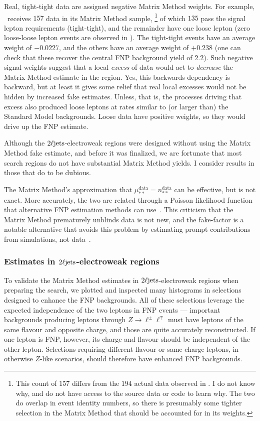 Real, tight-tight data are assigned negative Matrix Method weights.
For example, \crvz\ receives $157$ data in its Matrix Method sample,%
\footnote{%
This count of $157$ differs from the $194$ actual data observed in \crvz.
I do not know why, and do not have access to the source data or code to
learn why.
The two do overlap in event identity numbers, so there is presumably some
tighter selection in the Matrix Method that should be accounted for in its
weights.
}
of which $135$ pass the signal lepton requirements (tight-tight),
and the remainder have one loose lepton (zero loose-loose lepton events
are observed in \crvz).
The tight-tight events have an average weight of $-0.0227$, and the others
have an average weight of $+0.238$ (one can check that these recover the
central FNP background yield of $2.2$).
Such negative signal weights suggest that a local \emph{excess} of data
would act to \emph{decrease} the Matrix Method estimate in the region.
Yes, this backwards dependency is backward, but at least it gives some relief
that real local excesses would not be hidden by increased fake estimates.
Unless, that is, the processes driving that excess also produced loose leptons
at rates similar to (or larger than) the Standard Model backgrounds.
Loose data have positive weights, so they would drive up the FNP estimate.

Although the $2\ell\mathrm{jets}$-electroweak regions were designed without using the
Matrix Method fake estimate, and before it was finalized, we are fortunate that
most search regions do not have substantial Matrix Method yields.
I consider results in those that do to be dubious.

The Matrix Method's approximation that
$\mu^\textrm{data}_{**} = n^\textrm{data}_{**}$ can be effective, but is not
exact.
More accurately, the two are related through a Poisson likelihood function
that alternative FNP estimation methods can use~\cite{
Erdmann:2021pqi,
Gillam:2014xua
}.
This criticism that the Matrix Method prematurely unblinds data is not new, and
the fake-factor is a notable alternative that avoids this problem by estimating
prompt contributions from simulations, not data~\cite{
Alison2015,
ATLAS:2017ztq
}.

\subsubsection{%
Estimates in \texorpdfstring{$2\ell\mathrm{jets}$}{2Ljets}-electroweak regions%
}
\label{sec:2ljets_matrix_method_ewk}
To validate the Matrix Method estimates in $2\ell\mathrm{jets}$-electroweak regions
when preparing the search, we plotted and inspected many histograms in
selections designed to enhance the FNP backgrounds.
All of these selections leverage the expected independence of the two leptons
in FNP events --- important backgrounds producing leptons through
$Z\to \ell^\pm\ell^\mp$ must have leptons of the same flavour and
opposite charge, and those are quite accurately reconstructed.
If one lepton is FNP, however, its charge and flavour should be
independent of the other lepton.
Selections requiring different-flavour or same-charge leptons,
in otherwise $Z$-like scenarios, should therefore have enhanced FNP
backgrounds.

